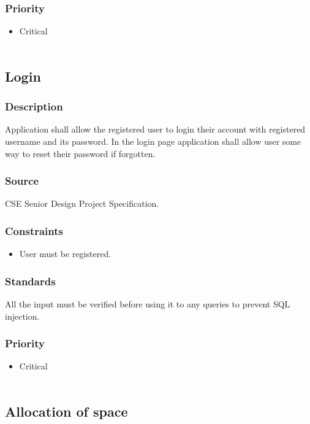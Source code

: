 \subsubsection{Priority}

\begin{itemize}
\item Critical\\ \\
\end{itemize}

\subsection{Login}
\subsubsection{Description}
Application shall allow the registered user to login their account with registered username and its password. In the login page application shall allow user some way to reset their password if forgotten. 
\subsubsection{Source}
CSE Senior Design Project Specification.
\subsubsection{Constraints}
\begin{itemize}
\item User must be registered. 
\end{itemize}
\subsubsection{Standards}
All the input must be verified before using it to any queries to prevent SQL injection. 
\subsubsection{Priority}
\begin{itemize}
\item Critical\\ \\
\end{itemize}

\subsection{Allocation of space}
